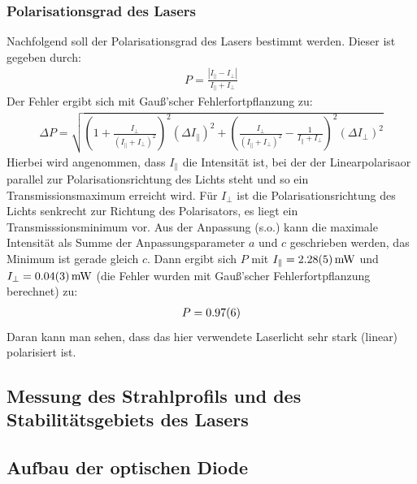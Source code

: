 \documentclass[11pt, a4paper]{article}
\numberwithin{equation}{section}
\begin{document}
\subsubsection{Polarisationsgrad des Lasers}
Nachfolgend soll der Polarisationsgrad des Lasers bestimmt werden.
Dieser ist gegeben durch:
\begin{align}
P=\frac{|I_{\parallel}-I_{\perp}|}{I_{\parallel}+I_{\perp}}
\end{align}
Der Fehler ergibt sich mit Gauß'scher Fehlerfortpflanzung zu:
\begin{align}
\Delta P=\sqrt{\left(1+\frac{I_{\perp}}{(I_{\parallel}+I_{\perp})^2}\right)^2\left(\Delta I_{\parallel}\right)^2 + \left(\frac{I_{\perp}}{(I_{\parallel}+I_{\perp})^2}-\frac{1}{I_{\parallel}+I_{\perp}}\right)^2\left(\Delta I_{\perp}\right)^2}
\end{align}
Hierbei wird angenommen, dass $I_\parallel$ die Intensität ist, bei der der Linearpolarisaor parallel zur Polarisationsrichtung des Lichts steht und so ein Transmissionsmaximum erreicht wird.
Für $I_\perp$ ist die Polarisationsrichtung des Lichts senkrecht zur Richtung des Polarisators, es liegt ein Transmisssionsminimum vor.
Aus der Anpassung (s.o.) kann die maximale Intensität als Summe der Anpassungsparameter $a$ und $c$ geschrieben werden, das Minimum ist gerade gleich $c$. 
Dann ergibt sich $P$ mit $I_\parallel=\SI{2.28+-0.05}{\milli\watt}$ und $I_\perp=\SI{0.04+-0.03}{\milli\watt}$ (die Fehler wurden mit Gauß'scher Fehlerfortpflanzung berechnet) zu:
\begin{align}
P=\num{0.97+-0.06}
\end{align}
Daran kann man sehen, dass das hier verwendete Laserlicht sehr stark (linear) polarisiert ist.

\subsection{Messung des Strahlprofils und des Stabilitätsgebiets des Lasers}

\subsection{Aufbau der optischen Diode}
\end{document}
